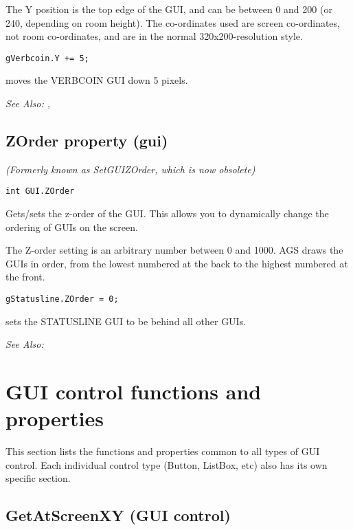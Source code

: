 The Y position is the top edge of the GUI, and can be between 0 and 200 (or 240, depending
on room height). The co-ordinates used are screen co-ordinates, not room co-ordinates,
and are in the normal 320x200-resolution style.

\begin{verbatim}
gVerbcoin.Y += 5;
\end{verbatim}

moves the VERBCOIN GUI down 5 pixels.

\it{See Also:} , 


\subsection{ZOrder property (gui)}\label{GUI.ZOrder}%

\it{(Formerly known as SetGUIZOrder, which is now obsolete)}

\begin{verbatim}
int GUI.ZOrder
\end{verbatim}
Gets/sets the z-order of the GUI. This allows you to dynamically change the ordering
of GUIs on the screen.

The Z-order setting is an arbitrary number between 0 and 1000. AGS draws the GUIs
in order, from the lowest numbered at the back to the highest numbered at the front.

\begin{verbatim}
gStatusline.ZOrder = 0;
\end{verbatim}

sets the STATUSLINE GUI to be behind all other GUIs.

\it{See Also:} 




\section{GUI control functions and properties}

This section lists the functions and properties common to all types of GUI control.
Each individual control type (Button, ListBox, etc) also has its own specific section.


\subsection{GetAtScreenXY (GUI control)}\label{GUIControl.GetAtScreenXY}%

